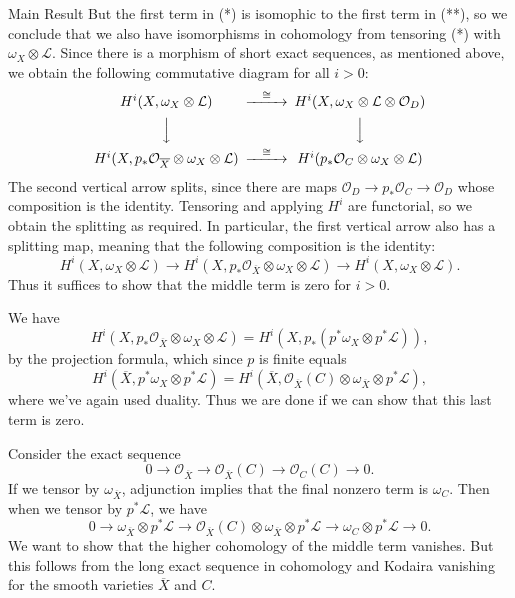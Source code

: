 \documentclass{article}
\begin{document}
\begin{section}{Main Result}
But the first term in (*) is isomophic to the first term in (**), so we conclude that we also have isomorphisms in cohomology from tensoring (*) with $\omega_X \otimes \mathcal{L}.$  Since there is a morphism of short exact sequences, as mentioned above, we obtain the following commutative diagram for all $i>0$:
$$\begin{CD}
H^i(X, \omega_X \otimes \mathcal{L})                                                                @>\cong>>               H^i(X, \omega_X \otimes \mathcal{L} \otimes \mathcal{O}_D) \\
@VVV                                                                                                                                                      @VVV \\
H^i(X, p_*\mathcal{O}_{\overline{X}} \otimes \omega_X \otimes \mathcal{L})  @>\cong>>             H^i(p_*\mathcal{O}_C \otimes \omega_X \otimes \mathcal{L}) \\
\end{CD}$$
The second vertical arrow splits, since there are maps $\mathcal{O}_D \rightarrow p_*\mathcal{O}_C \rightarrow \mathcal{O}_D$ whose composition is the identity.  Tensoring and applying $H^i$ are functorial, so we obtain the splitting as required.   In particular, the first vertical arrow also has a splitting map, meaning that the following composition is the identity:  $$H^i(X, \omega_X \otimes \mathcal{L}) \rightarrow H^i(X, p_*\mathcal{O}_{\overline{X}} \otimes \omega_X \otimes \mathcal{L}) \rightarrow H^i(X, \omega_X \otimes \mathcal{L}).$$  Thus it suffices to show that the middle term is zero for $i>0$.

We have $$H^i(X, p_*\mathcal{O}_{\overline{X}} \otimes \omega_X \otimes \mathcal{L}) = H^i(X, p_*(p^*\omega_X \otimes p^*\mathcal{L})),$$ by the projection formula, which since $p$ is finite equals $$H^i(\overline{X}, p^*\omega_X \otimes p^*\mathcal{L}) = H^i(\overline{X}, \mathcal{O}_{\overline{X}}(C) \otimes \omega_{\overline{X}} \otimes p^*\mathcal{L}),$$ where we've again used duality.  Thus we are done if we can show that this last term is zero.

Consider the exact sequence $$0 \rightarrow \mathcal{O}_{\overline{X}} \rightarrow \mathcal{O}_{\overline{X}}(C) \rightarrow \mathcal{O}_C(C) \rightarrow 0.$$  If we tensor by $\omega_{\overline{X}}$, adjunction implies that the final nonzero term is $\omega_C$.  Then when we tensor by $p^*\mathcal{L}$, we have $$0 \rightarrow \omega_{\overline{X}} \otimes p^*\mathcal{L} \rightarrow \mathcal{O}_{\overline{X}}(C) \otimes \omega_{\overline{X}} \otimes p^*\mathcal{L} \rightarrow \omega_C \otimes p^*\mathcal{L} \rightarrow 0.$$  We want to show that the higher cohomology of the middle term vanishes.  But this follows from the long exact sequence in cohomology and Kodaira vanishing for the smooth varieties $\overline{X}$ and $C$.  


\end{section}
\end{document}
